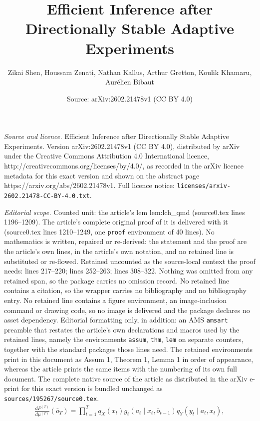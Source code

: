 \documentclass[10pt,a4paper]{amsart}
\title{Efficient Inference after Directionally Stable Adaptive Experiments}
\author{Zikai Shen, Houssam Zenati, Nathan Kallus, Arthur Gretton, Koulik Khamaru, Aur\'elien Bibaut}
\date{Source: arXiv:2602.21478v1 (CC BY 4.0)}
\begin{document}
\maketitle

\noindent\emph{Source and licence.} Efficient Inference after Directionally Stable Adaptive Experiments. Version arXiv:2602.21478v1 (CC BY 4.0), distributed by arXiv under the Creative Commons Attribution 4.0 International licence, http://creativecommons.org/licenses/by/4.0/, as recorded in the arXiv licence metadata for this exact version and shown on the abstract page https://arxiv.org/abs/2602.21478v1. Full licence notice: \texttt{licenses/arxiv-2602.21478-CC-BY-4.0.txt}.\par\smallskip

\noindent\textit{Editorial scope.} Counted unit: the article's lem lem:lch\_qmd (source0.tex lines 1196--1209). The article's complete original proof of it is delivered with it (source0.tex lines 1210--1249, one \texttt{proof} environment of 40 lines). No mathematics is written, repaired or re-derived: the statement and the proof are the article's own lines, in the article's own notation, and no retained line is substituted or re-flowed.  Retained uncounted as the source-local context the proof needs: lines 217--220; lines 252--263; lines 308--322.  Nothing was omitted from any retained span, so the package carries no omission record.  No retained line contains a citation, so the wrapper carries no bibliography and no bibliography entry.  No retained line contains a figure environment, an image-inclusion command or drawing code, so no image is delivered and the package declares no asset dependency.  Editorial formatting only, in addition: an AMS \texttt{amsart} preamble that restates the article's own declarations and macros used by the retained lines, namely the environments \texttt{assum}, \texttt{thm}, \texttt{lem} on separate counters, together with the standard packages those lines need.  The retained environments print in this document as Assum 1, Theorem 1, Lemma 1 in order of appearance, whereas the article prints the same items with the numbering of its own full document.  The complete native source of the article as distributed in the arXiv e-print for this exact version is bundled unchanged as \texttt{sources/195267/source0.tex}.
\begin{align}
    \frac{dP^{(T)}}{d \mu^{(T)}}(\bar{o}_T) = \prod_{t=1}^{T}q_X(x_t)g_t(a_t\mid x_t, \bar{o}_{t-1})q_{Y}(y_t\mid a_t, x_t),
    \label{eq:model_factorization}
\end{align}
\end{document}
